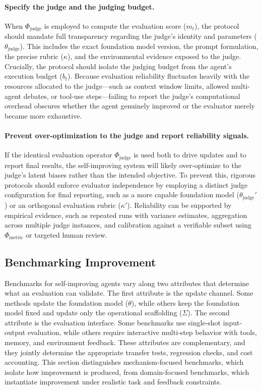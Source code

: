\paragraph{Specify the judge and the judging budget.} When $\Phi_{\text{judge}}$ is employed to compute the evaluation score ($m_t$), the protocol should mandate full transparency regarding the judge's identity and parameters ($\theta_{\text{judge}}$). This includes the exact foundation model version, the prompt formulation, the precise rubric ($\kappa$), and the environmental evidence exposed to the judge. Crucially, the protocol should isolate the judging budget from the agent's execution budget ($b_t$). Because evaluation reliability fluctuates heavily with the resources allocated to the judge---such as context window limits, allowed multi-agent debates, or tool-use steps---failing to report the judge's computational overhead obscures whether the agent genuinely improved or the evaluator merely became more exhaustive.


\paragraph{Prevent over-optimization to the judge and report reliability signals.} If the identical evaluation operator $\Phi_{\text{judge}}$ is used both to drive updates and to report final results, the self-improving system will likely over-optimize to the judge's latent biases rather than the intended objective. To prevent this, rigorous protocols should enforce evaluator independence by employing a distinct judge configuration for final reporting, such as a more capable foundation model ($\theta_{\text{judge}}'$) or an orthogonal evaluation rubric ($\kappa'$). Reliability can be supported by empirical evidence, such as repeated runs with variance estimates, aggregation across multiple judge instances, and calibration against a verifiable subset using $\Phi_{\text{metric}}$ or targeted human review.

\subsection{Benchmarking Improvement}
\label{sec:Benchmarking_Improvement}

Benchmarks for self-improving agents vary along two attributes that determine what an evaluation can validate. The first attribute is the update channel. Some methods update the foundation model ($\theta$), while others keep the foundation model fixed and update only the operational scaffolding ($\Sigma$). The second attribute is the evaluation interface. Some benchmarks use single-shot input-output evaluation, while others require interactive multi-step behavior with tools, memory, and environment feedback. These attributes are complementary, and they jointly determine the appropriate transfer tests, regression checks, and cost accounting. This section distinguishes mechanism-focused benchmarks, which isolate how improvement is produced, from domain-focused benchmarks, which instantiate improvement under realistic task and feedback constraints.


